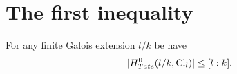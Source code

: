 




\section{The first inequality}

\begin{theorem} \label{thm:first inequality}
	For any finite Galois extension $l/k$ be have
	\[
		|H^0_{Tate}(l/k, \mathrm{Cl}_{l}) | \le [l : k].
	\]
\end{theorem}

